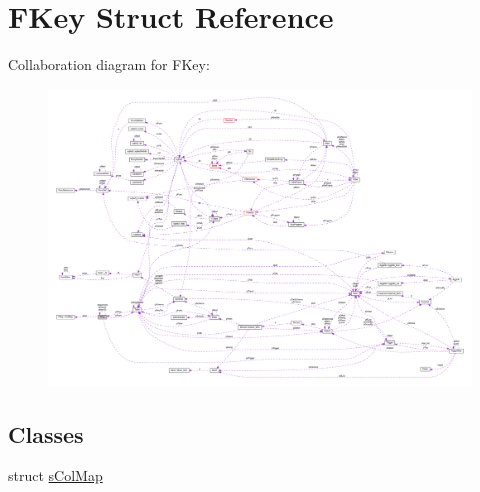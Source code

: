 \hypertarget{struct_f_key}{\section{F\-Key Struct Reference}
\label{struct_f_key}
}


Collaboration diagram for F\-Key\-:\nopagebreak
\begin{figure}[H]
\begin{center}
\leavevmode
\includegraphics[width=350pt]{struct_f_key__coll__graph}
\end{center}
\end{figure}
\subsection*{Classes}
\begin{DoxyCompactItemize}
\item 
struct \hyperlink{struct_f_key_1_1s_col_map}{s\-Col\-Map}
\end{DoxyCompactItemize}
